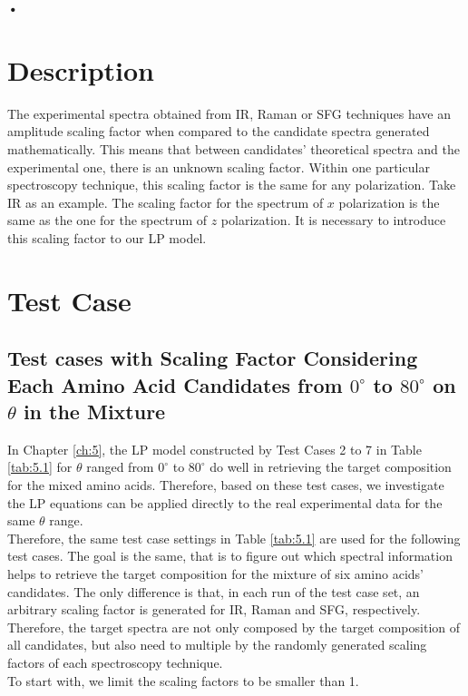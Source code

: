 \textbf{•} \label{ch:6}
\section{Description}
The experimental spectra obtained from IR, Raman or SFG techniques have an amplitude scaling factor when compared to the candidate spectra generated mathematically. This means that between candidates' theoretical spectra and the experimental one, there is an unknown scaling factor. Within one particular spectroscopy technique, this scaling factor is the same for any polarization. Take IR as an example. The scaling factor for the spectrum of $x$ polarization is the same as the one for the spectrum of $z$ polarization. It is necessary to introduce this scaling factor to our LP model. \\

\section{Test Case}
\subsection{Test cases with Scaling Factor Considering Each Amino Acid Candidates from $0^{\circ}$ to $80^{\circ}$ on $\theta$ in the Mixture}
In Chapter \ref{ch:5}, the LP model constructed by Test Cases 2 to 7 in Table \ref{tab:5.1} for $\theta$ ranged from $0^{\circ}$ to $80^{\circ}$ do well in retrieving the target composition for the mixed amino acids. Therefore, based on these test cases, we investigate the LP equations can be applied directly to the real experimental data for the same $\theta$ range.\\

Therefore, the same test case settings in Table \ref{tab:5.1} are used for the following test cases. The goal is the same, that is to figure out which spectral information helps to retrieve the target composition for the mixture of six amino acids' candidates. The only difference is that, in each run of the test case set, an arbitrary scaling factor is generated for IR, Raman and SFG, respectively. Therefore, the target spectra are not only composed by the target composition of all candidates, but also need to multiple by the randomly generated scaling factors of each spectroscopy technique. \\

To start with, we limit the scaling factors to be smaller than 1. \\

